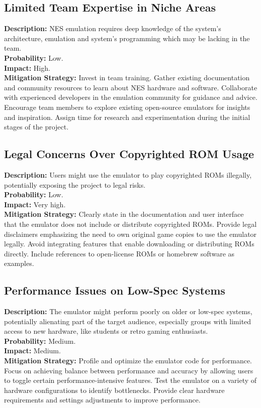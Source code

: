 \documentclass[a4paper, 11pt]{article}
\begin{document}
\subsection{Limited Team Expertise in Niche Areas}
\textbf{Description:} NES emulation requires deep knowledge of the system's architecture, emulation and system's programming which may be lacking in the team.\\
\textbf{Probability:} Low.\\
\textbf{Impact:} High.\\
\textbf{Mitigation Strategy:} Invest in team training. Gather existing documentation and community resources to learn about NES hardware and software. Collaborate with experienced developers in the emulation community for guidance and advice. Encourage team members to explore existing open-source emulators for insights and inspiration. Assign time for research and experimentation during the initial stages of the project.\\

\subsection{Legal Concerns Over Copyrighted ROM Usage}
\textbf{Description:} Users might use the emulator to play copyrighted ROMs illegally, potentially exposing the project to legal risks.\\
\textbf{Probability:} Low.\\
\textbf{Impact:} Very high.\\
\textbf{Mitigation Strategy:} Clearly state in the documentation and user interface that the emulator does not include or distribute copyrighted ROMs. Provide legal disclaimers emphasizing the need to own original game copies to use the emulator legally. Avoid integrating features that enable downloading or distributing ROMs directly. Include references to open-license ROMs or homebrew software as examples.\\

\newpage\subsection{Performance Issues on Low-Spec Systems}
\textbf{Description:} The emulator might perform poorly on older or low-spec systems, potentially alienating part of the target audience, especially groups with limited access to new hardware, like students or retro gaming enthusiasts.\\
\textbf{Probability:} Medium.\\
\textbf{Impact:} Medium.\\
\textbf{Mitigation Strategy:} Profile and optimize the emulator code for performance. Focus on achieving balance between performance and accuracy by allowing users to toggle certain performance-intensive features. Test the emulator on a variety of hardware configurations to identify bottlenecks. Provide clear hardware requirements and settings adjustments to improve performance.\\
\end{document}
